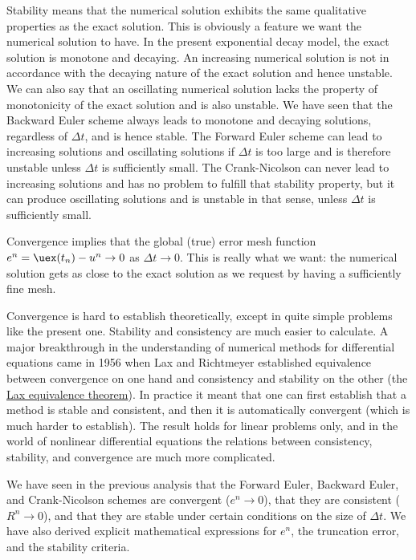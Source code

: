 \documentclass[graybox,sectrefs,envcountresetchap,open=right,final]{svmonodo}
\begin{document}
Stability means that the numerical solution exhibits the same
qualitative properties as the exact solution. This is obviously a
feature we want the numerical solution to have. In the present
exponential decay model, the exact solution is monotone and
decaying. An increasing numerical solution is not in accordance with
the decaying nature of the exact solution and hence unstable. We can
also say that an oscillating numerical solution lacks the property of
monotonicity of the exact solution and is also unstable. We have seen
that the Backward Euler scheme always leads to monotone and decaying
solutions, regardless of $\Delta t$, and is hence stable. The Forward
Euler scheme can lead to increasing solutions and oscillating
solutions if $\Delta t$ is too large and is therefore unstable unless
$\Delta t$ is sufficiently small.  The Crank-Nicolson can never lead
to increasing solutions and has no problem to fulfill that stability
property, but it can produce oscillating solutions and is unstable in
that sense, unless $\Delta t$ is sufficiently small.

Convergence implies that the global (true) error mesh function $e^n =
\uex(t_n)-u^n\rightarrow 0$ as $\Delta t\rightarrow 0$. This is really
what we want: the numerical solution gets as close to the exact
solution as we request by having a sufficiently fine mesh.

Convergence is hard to establish theoretically, except in quite simple
problems like the present one. Stability and consistency are much
easier to calculate. A major breakthrough in the understanding of
numerical methods for differential equations came in 1956 when Lax and
Richtmeyer established equivalence between convergence on one hand and
consistency and stability on the other (the \href{{http://en.wikipedia.org/wiki/Lax_equivalence_theorem}}{Lax equivalence theorem}).  In practice
it meant that one can first establish that a method is stable and
consistent, and then it is automatically convergent (which is much
harder to establish).  The result holds for linear problems only, and
in the world of nonlinear differential equations the relations between
consistency, stability, and convergence are much more complicated.

We have seen in the previous analysis that the Forward Euler,
Backward Euler, and Crank-Nicolson schemes are convergent ($e^n\rightarrow 0$),
that they are consistent ($R^n\rightarrow 0$), and that they are
stable under certain conditions on the size of $\Delta t$.
We have also derived explicit mathematical expressions for $e^n$,
the truncation error, and the stability criteria.
\end{document}
